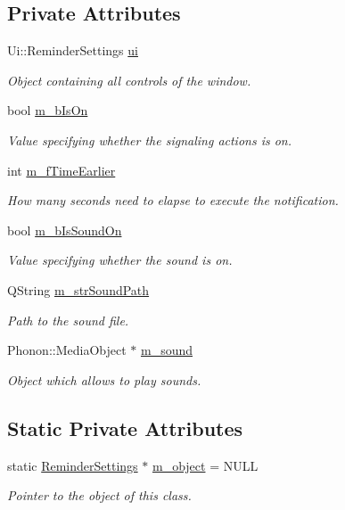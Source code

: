 \subsection*{Private Attributes}
\begin{DoxyCompactItemize}
\item 
Ui\-::\-Reminder\-Settings \hyperlink{class_reminder_settings_a8cb71405093ce262c5568ee0ee1f5365}{ui}
\begin{DoxyCompactList}\small\item\em Object containing all controls of the window. \end{DoxyCompactList}\item 
bool \hyperlink{class_reminder_settings_a7c9b7a409f4f113d2cc2207aee5d9881}{m\-\_\-b\-Is\-On}
\begin{DoxyCompactList}\small\item\em Value specifying whether the signaling actions is on. \end{DoxyCompactList}\item 
int \hyperlink{class_reminder_settings_ae5a57641e84294e51aa2111c7569bc40}{m\-\_\-f\-Time\-Earlier}
\begin{DoxyCompactList}\small\item\em How many seconds need to elapse to execute the notification. \end{DoxyCompactList}\item 
bool \hyperlink{class_reminder_settings_ad0514a60ffede305109f60f671e721a4}{m\-\_\-b\-Is\-Sound\-On}
\begin{DoxyCompactList}\small\item\em Value specifying whether the sound is on. \end{DoxyCompactList}\item 
Q\-String \hyperlink{class_reminder_settings_a3e4a8a906147325c9f299304d7b38c31}{m\-\_\-str\-Sound\-Path}
\begin{DoxyCompactList}\small\item\em Path to the sound file. \end{DoxyCompactList}\item 
Phonon\-::\-Media\-Object $\ast$ \hyperlink{class_reminder_settings_ac3cc26f8acada7bfc1b7a8cee3e2551c}{m\-\_\-sound}
\begin{DoxyCompactList}\small\item\em Object which allows to play sounds. \end{DoxyCompactList}\end{DoxyCompactItemize}
\subsection*{Static Private Attributes}
\begin{DoxyCompactItemize}
\item 
static \hyperlink{class_reminder_settings}{Reminder\-Settings} $\ast$ \hyperlink{class_reminder_settings_adeaec35aa1f8a576bd8793d6e8eeaed3}{m\-\_\-object} = N\-U\-L\-L
\begin{DoxyCompactList}\small\item\em Pointer to the object of this class. \end{DoxyCompactList}\end{DoxyCompactItemize}


